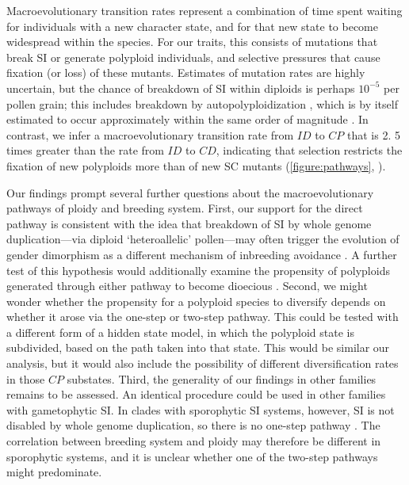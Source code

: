 Macroevolutionary transition rates represent a combination of time spent waiting for individuals with a new character state, and for that new state to become widespread within the species.
For our traits, this consists of mutations that break SI or generate polyploid individuals, and selective pressures that cause fixation (or loss) of these mutants.
Estimates of mutation rates are highly uncertain, but the chance of breakdown of SI within diploids is perhaps $10^{-5}$ per pollen grain; this includes breakdown by autopolyploidization \citep{lewis1979}, which is by itself estimated to occur approximately within the same order of magnitude \citep{ramsey_1998}. 
In contrast, we infer a macroevolutionary transition rate from $ID$ to $CP$ that is 2. 5 times greater than the rate from $ID$ to $CD$, indicating that selection restricts the fixation of new polyploids more than of new SC mutants  (\cref{figure:pathways}, \citealt{robertson_2011}). 

Our findings prompt several further questions about the macroevolutionary pathways of ploidy and breeding system.
%
First, our support for the direct pathway is consistent with the idea that breakdown of SI by whole genome duplication---via diploid `heteroallelic' pollen---may often trigger the evolution of gender dimorphism as a different mechanism of inbreeding avoidance \citep{miller_2000}.
A further test of this hypothesis would additionally examine the propensity of polyploids generated through either pathway to become dioecious \citep{robertson_2011}.
%
Second, we might wonder whether the propensity for a polyploid species to diversify depends on whether it arose via the one-step or two-step pathway.
This could be tested with a different form of a hidden state model, in which the polyploid state is subdivided, based on the path taken into that state.
This would be similar our analysis, but it would also include the possibility of different diversification rates in those $CP$ substates.
%
Third, the generality of our findings in other families remains to be assessed.
An identical procedure could be used in other families with gametophytic SI.
In clades with sporophytic SI systems, however, SI is not disabled by whole genome duplication, so there is no one-step pathway \citep{miller_2000,mable_2004}.
The correlation between breeding system and ploidy may therefore be different in sporophytic systems, and it is unclear whether one of the two-step pathways might predominate.

